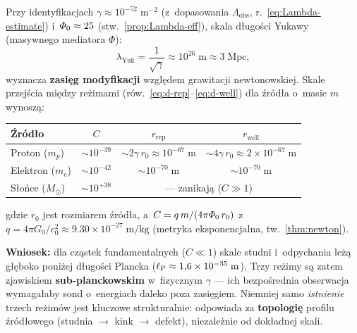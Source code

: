 \begin{proposition}\label{prop:skale-fizyczne}
Przy identyfikacjach $\gamma \approx 10^{-52}\;\mathrm{m}^{-2}$
(z~dopasowania $\Lambda_{\mathrm{obs}}$, r.~\eqref{eq:Lambda-estimate})
i~$\varPhi_0 \approx 25$ (stw.~\ref{prop:Lambda-eff}),
skala d\l{}ugo\'sci Yukawy (masywnego mediatora $\Phi$):
\begin{equation}\label{eq:lambda-Yukawa}
  \lambda_{\mathrm{Yuk}} = \frac{1}{\sqrt{\gamma}}
  \approx 10^{26}\;\mathrm{m} \approx 3\;\mathrm{Mpc},
\end{equation}
wyznacza \textbf{zasi\k{e}g modyfikacji} wzgl\k{e}dem grawitacji
newtonowskiej. Skale przej\'scia mi\k{e}dzy re\.zimami
(r\'ow.~\ref{eq:d-rep}--\ref{eq:d-well}) dla \'zr\'od\l{}a
o~masie $m$ wynosz\k{a}:
\begin{center}
\small
\begin{tabular}{@{}lccc@{}}
\toprule
\textbf{\'Zr\'od\l{}o} & $C$ & $r_{\mathrm{rep}}$ & $r_{\mathrm{well}}$ \\
\midrule
Proton ($m_p$)
  & $\sim 10^{-39}$ & $\sim 2\gamma\,r_0 \approx 10^{-67}\;\mathrm{m}$
  & $\sim 4\gamma\,r_0 \approx 2\times10^{-67}\;\mathrm{m}$ \\
Elektron ($m_e$)
  & $\sim 10^{-42}$ & $\sim 10^{-70}\;\mathrm{m}$
  & $\sim 10^{-70}\;\mathrm{m}$ \\
S\l{}o\'nce ($M_\odot$)
  & $\sim 10^{+38}$ & \multicolumn{2}{c}{--- zanikaj\k{a} ($C \gg 1$)} \\
\bottomrule
\end{tabular}
\end{center}

\noindent
gdzie $r_0$ jest rozmiarem \'zr\'od\l{}a, a~$C = q\,m/(4\pi\varPhi_0\,r_0)$
z~$q = 4\pi G_0/c_0^2 \approx 9.30 \times 10^{-27}\;\mathrm{m/kg}$
(metryka eksponencjalna, tw.~\ref{thm:newton}).

\medskip\noindent
\textbf{Wniosek:} dla cz\k{a}stek fundamentalnych
($C \ll 1$) skale studni i~odpychania le\.z\k{a} g\l{}\k{e}boko
poni\.zej d\l{}ugo\'sci Plancka ($\ell_{\mathrm{P}} \approx 1{,}6\times10^{-35}\;\mathrm{m}$).
Trzy re\.zimy s\k{a} zatem zjawiskiem
\textbf{sub-planckowskim} w~fizycznym $\gamma$ ---
ich bezpo\'srednia obserwacja wymaga\l{}aby sond
o~energiach daleko poza zasi\k{e}giem. Niemniej samo
\emph{istnienie} trzech re\.zim\'ow jest kluczowe
strukturalnie: odpowiada za \textbf{topologi\k{e}}
profilu \'zr\'od\l{}owego (studnia $\to$ kink $\to$
defekt), niezale\.znie od dok\l{}adnej skali.
\end{proposition}


